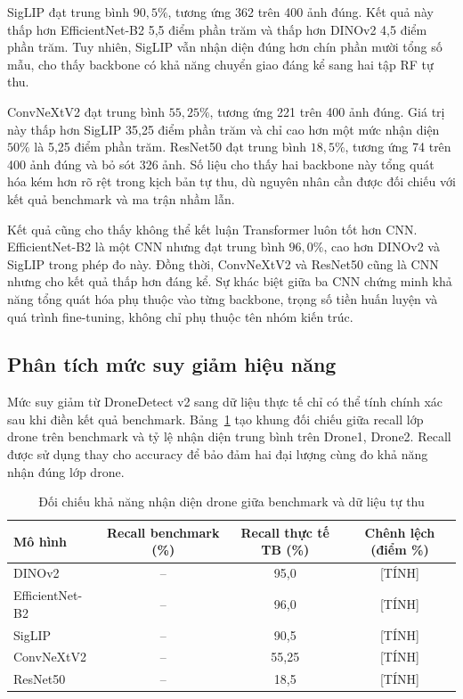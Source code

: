 \documentclass[../DoAn.tex]{subfiles}
\begin{document}
SigLIP đạt trung bình $90,5\%$, tương ứng 362 trên 400 ảnh đúng. Kết quả này thấp hơn EfficientNet-B2 5,5 điểm phần trăm và thấp hơn DINOv2 4,5 điểm phần trăm. Tuy nhiên, SigLIP vẫn nhận diện đúng hơn chín phần mười tổng số mẫu, cho thấy backbone có khả năng chuyển giao đáng kể sang hai tập RF tự thu.

ConvNeXtV2 đạt trung bình $55,25\%$, tương ứng 221 trên 400 ảnh đúng. Giá trị này thấp hơn SigLIP 35,25 điểm phần trăm và chỉ cao hơn một mức nhận diện $50\%$ là 5,25 điểm phần trăm. ResNet50 đạt trung bình $18,5\%$, tương ứng 74 trên 400 ảnh đúng và bỏ sót 326 ảnh. Số liệu cho thấy hai backbone này tổng quát hóa kém hơn rõ rệt trong kịch bản tự thu, dù nguyên nhân cần được đối chiếu với kết quả benchmark và ma trận nhầm lẫn.

Kết quả cũng cho thấy không thể kết luận Transformer luôn tốt hơn CNN. EfficientNet-B2 là một CNN nhưng đạt trung bình $96,0\%$, cao hơn DINOv2 và SigLIP trong phép đo này. Đồng thời, ConvNeXtV2 và ResNet50 cũng là CNN nhưng cho kết quả thấp hơn đáng kể. Sự khác biệt giữa ba CNN chứng minh khả năng tổng quát hóa phụ thuộc vào từng backbone, trọng số tiền huấn luyện và quá trình fine-tuning, không chỉ phụ thuộc tên nhóm kiến trúc.


\subsection{Phân tích mức suy giảm hiệu năng}

Mức suy giảm từ DroneDetect v2 sang dữ liệu thực tế chỉ có thể tính chính xác sau khi điền kết quả benchmark. Bảng~\ref{tab:benchmark_real_drop} tạo khung đối chiếu giữa recall lớp drone trên benchmark và tỷ lệ nhận diện trung bình trên Drone1, Drone2. Recall được sử dụng thay cho accuracy để bảo đảm hai đại lượng cùng đo khả năng nhận đúng lớp drone.

\begin{table}[H]
    \centering
    \caption{Đối chiếu khả năng nhận diện drone giữa benchmark và dữ liệu tự thu}
    \label{tab:benchmark_real_drop}
    \renewcommand{\arraystretch}{1.3}
    \begin{tabular}{|p{}|c|c|c|}
        \hline
        \textbf{Mô hình} & \textbf{Recall benchmark (\%)} & \textbf{Recall thực tế TB (\%)} & \textbf{Chênh lệch (điểm \%)} \\ \hline
        DINOv2 & -- & 95,0 & [TÍNH] \\ \hline
        EfficientNet-B2 & -- & 96,0 & [TÍNH] \\ \hline
        SigLIP & -- & 90,5 & [TÍNH] \\ \hline
        ConvNeXtV2 & -- & 55,25 & [TÍNH] \\ \hline
        ResNet50 & -- & 18,5 & [TÍNH] \\ \hline
    \end{tabular}
\end{table}
\end{document}
